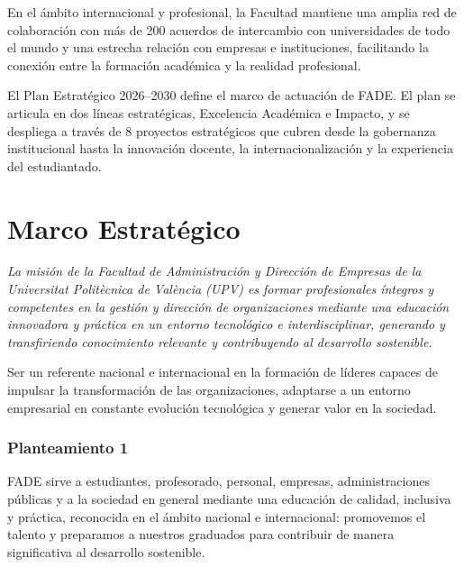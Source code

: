 \documentclass[11pt,a4paper]{scrreprt}
\begin{document}
En el ámbito internacional y profesional, la Facultad mantiene una amplia red de colaboración con más de 200 acuerdos de intercambio con universidades de todo el mundo y una estrecha relación con empresas e instituciones, facilitando la conexión entre la formación académica y la realidad profesional.

\begin{tcolorbox}[highlightbox]
El Plan Estratégico 2026--2030 define el marco de actuación de FADE. El plan se articula en dos líneas estratégicas, Excelencia Académica e Impacto, y se despliega a través de 8 proyectos estratégicos que cubren desde la gobernanza institucional hasta la innovación docente, la internacionalización y la experiencia del estudiantado.
\end{tcolorbox}

\clearpage
\chapter*{Marco Estrat\'egico}

\begin{tcolorbox}[descbox]
\small\itshape La misión de la Facultad de Administración y Dirección de Empresas de la Universitat Politècnica de València (UPV) es formar profesionales íntegros y competentes en la gestión y dirección de organizaciones mediante una educación innovadora y práctica en un entorno tecnológico e interdisciplinar, generando y transfiriendo conocimiento relevante y contribuyendo al desarrollo sostenible.
\end{tcolorbox}

\begin{tcolorbox}[fieldbox]
\small Ser un referente nacional e internacional en la formación de líderes capaces de impulsar la transformación de las organizaciones, adaptarse a un entorno empresarial en constante evolución tecnológica y generar valor en la sociedad.
\end{tcolorbox}

\subsection*{Planteamiento 1}
\small FADE sirve a estudiantes, profesorado, personal, empresas, administraciones públicas y a la sociedad en general mediante una educación de calidad, inclusiva y práctica, reconocida en el ámbito nacional e internacional: promovemos el talento y preparamos a nuestros graduados para contribuir de manera significativa al desarrollo sostenible.
\end{document}
